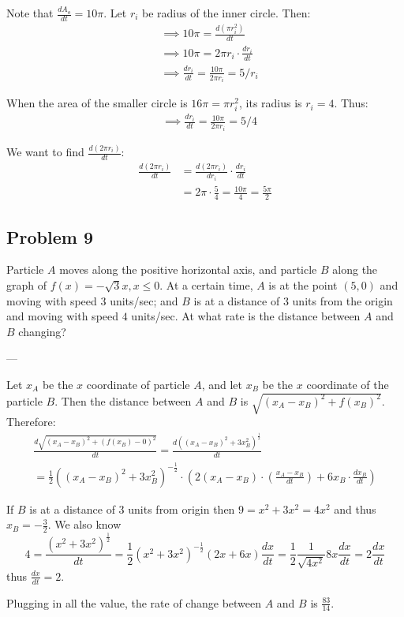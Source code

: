 Note that $\frac{dA_o}{dt}=10\pi$. Let $r_i$ be radius of the inner
circle. Then:
\begin{align*}
  &\implies 10\pi=\frac{d(\pi r_i^2)}{dt}\\
  &\implies 10\pi=2\pi r_i\cdot \frac{dr_i}{dt}\\
  &\implies \frac{dr_i}{dt}=\frac{10\pi}{2\pi r_i}=5/r_i
\end{align*}

When the area of the smaller circle is $16\pi=\pi r_i^2$, its radius is
$r_i=4$. Thus:
\begin{align*}
  &\implies \frac{dr_i}{dt}=\frac{10\pi}{2\pi r_i}=5/4
\end{align*}

We want to find $\frac{d(2\pi r_i)}{dt}$:
\begin{align*}
  \frac{d(2\pi r_i)}{dt}&=\frac{d(2\pi r_i)}{dr_i}\cdot \frac{dr_i}{dt}\\
                      &=2\pi\cdot \frac{5}{4}=\frac{10\pi}{4}=\frac{5\pi}{2}
\end{align*}

\subsection*{Problem 9}
Particle $A$ moves along the positive horizontal axis, and particle
$B$ along the graph of $f(x)=-\sqrt{3}x,x\leq0$. At a certain time,
$A$ is at the point $(5,0)$ and moving with speed $3$ units/sec; and
$B$ is at a distance of 3 units from the origin and moving with speed
$4$ units/sec. At what rate is the distance between $A$ and $B$
changing?

\vs---\vs

Let $x_A$ be the $x$ coordinate of particle $A$, and let $x_B$ be the
$x$ coordinate of the particle $B$. Then the distance between $A$ and
$B$ is $\sqrt{(x_A-x_B)^2 + f(x_B)^2}$. Therefore:
\begin{align*}
  \frac{d\sqrt{(x_A-x_B)^2 +
  (f(x_B)-0)^2}}{dt}=\frac{d((x_A-x_B)^2+3x_B^2)^{\frac{1}{2}}}{dt}\\
  =\frac{1}{2}((x_A-x_B)^2+3x_B^2)^{-\frac{1}{2}}\cdot(2(x_A-x_B)\cdot(\frac{x_A-x_B}{dt})+6x_B\cdot
                      \frac{dx_B}{dt})
\end{align*}

If $B$ is at a distance of 3 units from origin then $9=x^2+3x^2=4x^2$
and thus $x_B=-\frac{3}{2}$. We also know
\[4=\frac{(x^2+3x^2)^{\frac{1}{2}}}{dt}=\frac{1}{2}(x^2+3x^2)^{-\frac{1}{2}}(2x+6x)\frac{dx}{dt}=\frac{1}{2}\frac{1}{\sqrt{4x^2}}8x
  \frac{dx}{dt}=2 \frac{dx}{dt}\]
thus $\frac{dx}{dt}=2$.

\vs

Plugging in all the value, the rate of change between $A$ and $B$ is
$\frac{83}{14}$.


